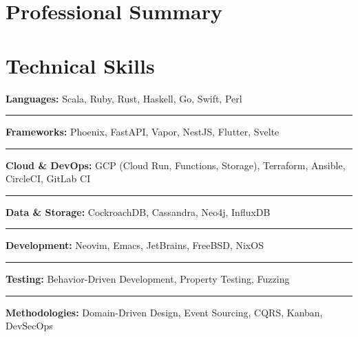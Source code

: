 \documentclass[]{friggeri-cv}
\newenvironment{skills}{%
  \par\noindent%
}{%
}
\newcommand{\skillsep}{%
  \par%
  \vspace{-3mm}
  \noindent%
  \textcolor{gray!30}{\rule{0.5\textwidth}{0.5pt}}%
  \vspace{-2mm}\par\vspace{-1mm}%
}
\newcommand{\category}[1]{%
  \par\noindent\textbf{#1:}\hspace{0.5em}%
}
\begin{document}

    
\vspace{5mm}
\section{Professional Summary}    
\vspace{-2mm}
\lipsum[1][1-3]

\section{Technical Skills}
\vspace{-2mm}
\begin{skills}
\category{Languages}Scala, Ruby, Rust, Haskell, Go, Swift, Perl

\skillsep
\category{Frameworks}Phoenix, FastAPI, Vapor, NestJS, Flutter, Svelte

\skillsep
\category{Cloud \& DevOps}GCP (Cloud Run, Functions, Storage), Terraform, Ansible, CircleCI, GitLab CI

\skillsep
\category{Data \& Storage}CockroachDB, Cassandra, Neo4j, InfluxDB

\skillsep
\category{Development}Neovim, Emacs, JetBrains, FreeBSD, NixOS

\skillsep
\category{Testing}Behavior-Driven Development, Property Testing, Fuzzing

\skillsep
\category{Methodologies}Domain-Driven Design, Event Sourcing, CQRS, Kanban, DevSecOps
\end{skills}

\vspace{1mm}
\end{document}
